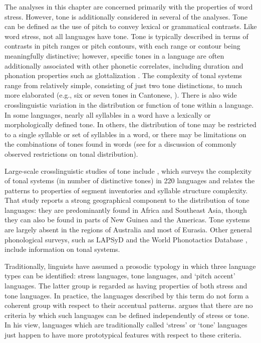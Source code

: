  The analyses in this chapter are concerned primarily with the properties of word stress. However, tone is additionally considered in several of the analyses. Tone can be defined as the use of pitch to convey lexical or grammatical contrasts. Like word stress, not all languages have tone. Tone is typically described in terms of contrasts in pitch ranges or pitch contours, with each range or contour being meaningfully distinctive; however, specific tones in a language are often additionally associated with other phonetic correlates, including duration and phonation properties such as glottalization \citep[477-81]{Laver1994}. The complexity of tonal systems range from relatively simple, consisting of just two tone distinctions, to much more elaborated (e.g., six or seven tones in Cantonese, \citealt{BauerBenedict1997}). There is also wide crosslinguistic variation in the distribution or function of tone within a language. In some languages, nearly all syllables in a word have a lexically or morphologically defined tone. In others, the distribution of tone may be restricted to a single syllable or set of syllables in a word, or there may be limitations on the combinations of tones found in words (see \citealt{Hyman2009} for a discussion of commonly observed restrictions on tonal distribution). 

  Large-scale crosslinguistic studies of tone include \citet{Maddieson2013d}, which surveys the complexity of tonal systems (in number of distinctive tones) in 220 languages and relates the patterns to properties of segment inventories and syllable structure complexity. That study reports a strong geographical component to the distribution of tone languages: they are predominantly found in Africa and Southeast Asia, though they can also be found in parts of New Guinea and the Americas. Tone systems are largely absent in the regions of Australia and most of Eurasia. Other general phonological surveys, such as LAPSyD \citep{MaddiesonEtAl2013} and the World Phonotactics Database \citep{DonohueEtAl2013}, include information on tonal systems.

  Traditionally, linguists have assumed a prosodic typology in which three language types can be identified: stress languages, tone languages, and ‘pitch accent’ languages. The latter group is regarded as having properties of both stress and tone languages. In practice, the languages described by this term do not form a coherent group with respect to their accentual patterns. \citet{Hyman2009} argues that there are no criteria by which such languages can be defined independently of stress or tone. In his view, languages which are traditionally called ‘stress’ or ‘tone’ languages just happen to have more prototypical features with respect to these criteria.

